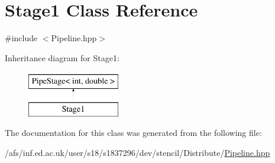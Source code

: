 \hypertarget{classStage1}{\section{Stage1 Class Reference}
\label{classStage1}
}


{\ttfamily \#include $<$Pipeline.\-hpp$>$}

Inheritance diagram for Stage1\-:\begin{figure}[H]
\begin{center}
\leavevmode
\includegraphics[height=2.000000cm]{classStage1}
\end{center}
\end{figure}


The documentation for this class was generated from the following file\-:\begin{DoxyCompactItemize}
\item 
/afs/inf.\-ed.\-ac.\-uk/user/s18/s1837296/dev/stencil/\-Distribute/\hyperlink{Pipeline_8hpp}{Pipeline.\-hpp}\end{DoxyCompactItemize}
